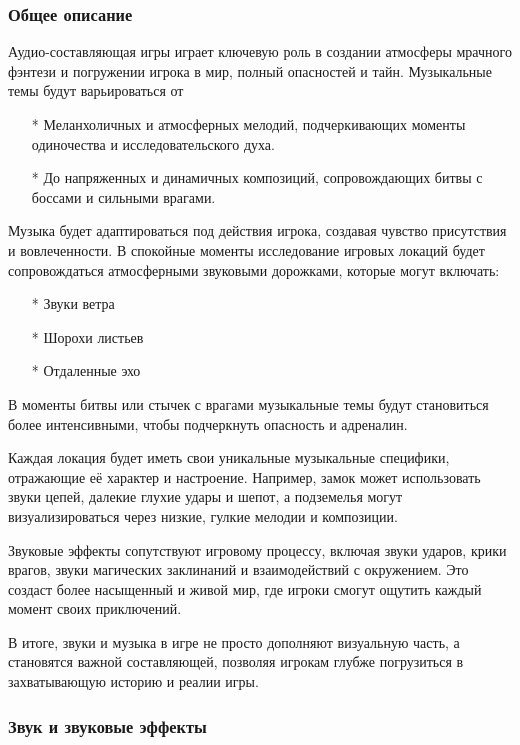 \documentclass{article}
\begin{document}
\subsubsection{Общее описание}
Аудио-составляющая игры играет ключевую роль в создании атмосферы мрачного фэнтези и погружении игрока в мир, полный опасностей и тайн. Музыкальные темы будут варьироваться от
\begin{itemize}
\item[*] Меланхоличных и атмосферных мелодий, подчеркивающих моменты одиночества и исследовательского духа.
\item[*] До напряженных и динамичных композиций, сопровождающих битвы с боссами и сильными врагами.
\end{itemize}
\par Музыка будет адаптироваться под действия игрока, создавая чувство присутствия и вовлеченности. В спокойные моменты исследование игровых локаций будет сопровождаться атмосферными звуковыми дорожками, которые могут включать:
\begin{itemize}
\item[*] Звуки ветра
\item[*] Шорохи листьев
\item[*] Отдаленные эхо
\end{itemize}
\par В моменты битвы или стычек с врагами музыкальные темы будут становиться более интенсивными, чтобы подчеркнуть опасность и адреналин.
\par Каждая локация будет иметь свои уникальные музыкальные специфики, отражающие её характер и настроение. Например, замок может использовать звуки цепей, далекие глухие удары и шепот, а подземелья могут визуализироваться через низкие, гулкие мелодии и композиции.
\par Звуковые эффекты сопутствуют игровому процессу, включая звуки ударов, крики врагов, звуки магических заклинаний и взаимодействий с окружением. Это создаст более насыщенный и живой мир, где игроки смогут ощутить каждый момент своих приключений.
\par В итоге, звуки и музыка в игре не просто дополняют визуальную часть, а становятся важной составляющей, позволяя игрокам глубже погрузиться в захватывающую историю и реалии игры.

\subsubsection{Звук и звуковые эффекты}
\end{document}
